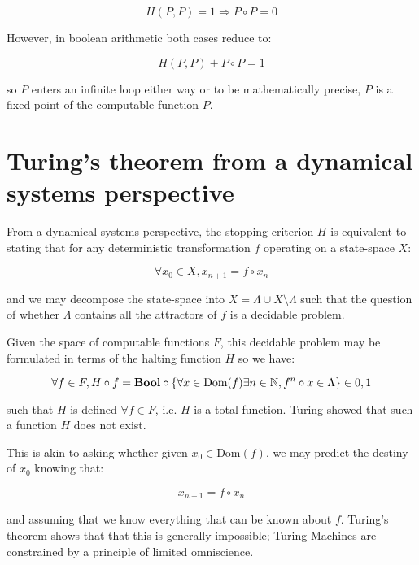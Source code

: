 \documentclass{article}
\begin{document}
\begin{equation}
H(P,P) = 1 \Rightarrow P \circ P = 0
\end{equation}

However, in boolean arithmetic both cases reduce to:

\begin{equation}
H(P,P) + P \circ P = 1
\end{equation}

so $P$ enters an infinite loop either way or to be mathematically precise, $P$ is a fixed
point of the computable function $P$.

\section{Turing's theorem from a dynamical systems perspective}

From a dynamical systems perspective, the stopping criterion $H$ is equivalent to stating that
for any deterministic transformation $f$ operating on a state-space $X$:

\begin{equation}
\forall x_0 \in X, x_{n+1} = f \circ x_n
\end{equation}

and we may decompose the state-space into $X = \Lambda \cup X \setminus \Lambda$ such that the question of whether $\Lambda$ contains all the attractors of $f$ is a decidable problem.

Given the space of computable functions $F$, this decidable problem may be formulated in terms of the
halting function $H$ so we have:

\begin{equation}
\forall f \in F, H \circ f = \textbf{Bool} \circ \{\forall x \in \text{Dom}(f) \exists n \in \mathbb{N}, f^n \circ x \in \Lambda\} \in \\{0,1\\}
\end{equation}

such that $H$ is defined $\forall f \in F$, i.e. $H$ is a total function. Turing showed that such a function $H$
does not exist.

This is akin to asking whether given $x_0 \in \text{Dom}(f)$, we may predict the destiny of $x_0$ knowing that:

\begin{equation}
x_{n+1} = f \circ x_n
\end{equation}

and assuming that we know everything that can be known about $f$. Turing's theorem shows that that this is generally impossible; Turing Machines are constrained by a principle of limited omniscience. 
\end{document}
